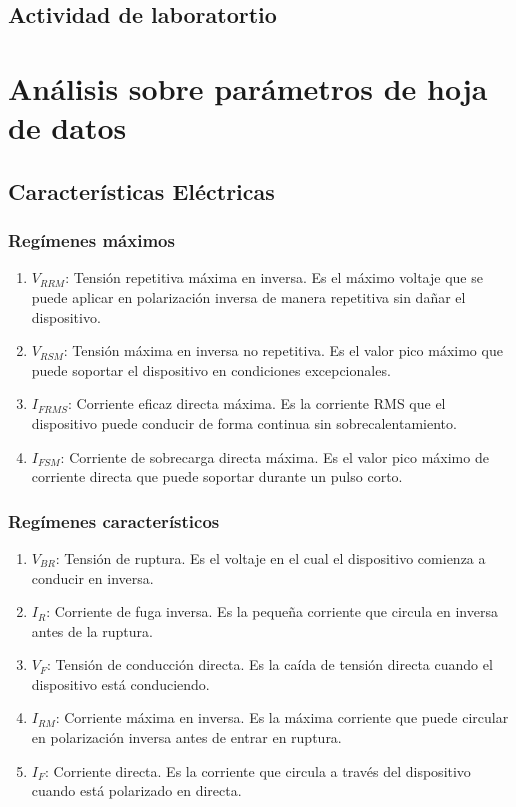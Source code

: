 \documentclass[chaptersright]{informeutn}
\begin{document}
  
  \section{Actividad de laboratortio}

\chapter{Análisis sobre parámetros de hoja de datos}

  \section*{Características Eléctricas}
  
    \subsection*{Regímenes máximos}
      \begin{enumerate}
        \item $V_{RRM}$: Tensión repetitiva máxima en inversa. Es el máximo voltaje que se puede aplicar en polarización inversa de manera repetitiva sin dañar el dispositivo.
        \item $V_{RSM}$: Tensión máxima en inversa no repetitiva. Es el valor pico máximo que puede soportar el dispositivo en condiciones excepcionales.
        \item $I_{FRMS}$: Corriente eficaz directa máxima. Es la corriente RMS que el dispositivo puede conducir de forma continua sin sobrecalentamiento.
        \item $I_{FSM}$: Corriente de sobrecarga directa máxima. Es el valor pico máximo de corriente directa que puede soportar durante un pulso corto.
      \end{enumerate}
    
    \subsection*{Regímenes característicos}
      \begin{enumerate}
        \item $V_{BR}$: Tensión de ruptura. Es el voltaje en el cual el dispositivo comienza a conducir en inversa.
        \item $I_R$: Corriente de fuga inversa. Es la pequeña corriente que circula en inversa antes de la ruptura.
        \item $V_F$: Tensión de conducción directa. Es la caída de tensión directa cuando el dispositivo está conduciendo.
        \item $I_{RM}$: Corriente máxima en inversa. Es la máxima corriente que puede circular en polarización inversa antes de entrar en ruptura.
        \item $I_F$: Corriente directa. Es la corriente que circula a través del dispositivo cuando está polarizado en directa.
      \end{enumerate}
  
\end{document}
